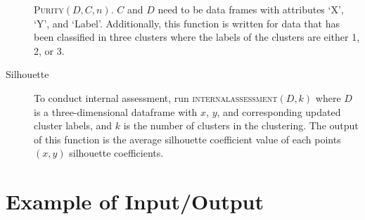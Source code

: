 \documentclass[psamsfonts,onesided,10pt]{amsart}
\begin{document}
\begin{description}
\textsc{Purity}$(D, C, n)$. $C$ and $D$ need to be data frames with 
attributes `X',  `Y', and `Label'. Additionally, this function is written for data that has been 
classified in three clusters where the labels of the clusters are either 1, 2, or 3. 
\item[Silhouette] To conduct internal assessment, run \textsc{internalassessment}$(D,k)$ 
where $D$ is a three-dimensional dataframe with $x$, $y$, and corresponding updated cluster 
labels, and $k$ is the number of clusters in the clustering. The output of this function is the 
average silhouette coefficient value of each points $(x,y)$ silhouette coefficients. 
\end{description}
 
\section{Example of Input/Output}
\end{document}
